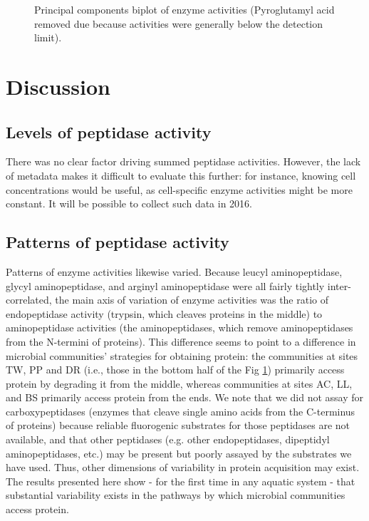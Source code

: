 \documentclass{article}
\begin{document}
    \begin{figure}
    \centering
    \caption{Principal components biplot of enzyme activities (Pyroglutamyl acid removed due because activities were generally below the detection limit). \label{p_pca}}
    \end{figure}
    
    \section{Discussion}
    
    \subsection{Levels of peptidase activity}
    
    There was no clear factor driving summed peptidase activities. However, the lack of metadata makes it difficult to evaluate this further: for instance, knowing cell concentrations would be useful, as cell-specific enzyme activities might be more constant. It will be possible to collect such data in 2016.
    
    \subsection{Patterns of peptidase activity}
    
    Patterns of enzyme activities likewise varied. Because leucyl aminopeptidase, glycyl aminopeptidase, and arginyl aminopeptidase were all fairly tightly inter-correlated, the main axis of variation of enzyme activities was the ratio of endopeptidase activity (trypsin, which cleaves proteins in the middle) to aminopeptidase activities (the aminopeptidases, which remove aminopeptidases from the N-termini of proteins). This difference seems to point to a difference in microbial communities' strategies for obtaining protein: the communities at sites TW, PP and DR (i.e., those in the bottom half of the Fig \ref{p_pca}) primarily access protein by degrading it from the middle, whereas communities at sites AC, LL, and BS primarily access protein from the ends. We note that we did not assay for carboxypeptidases (enzymes that cleave single amino acids from the C-terminus of proteins) because reliable fluorogenic substrates for those peptidases are not available, and that other peptidases (e.g. other endopeptidases, dipeptidyl aminopeptidases, etc.) may be present but poorly assayed by the substrates we have used. Thus, other dimensions of variability in protein acquisition may exist. The results presented here show - for the first time in any aquatic system - that substantial variability exists in the pathways by which microbial communities access protein.
    
\end{document}
